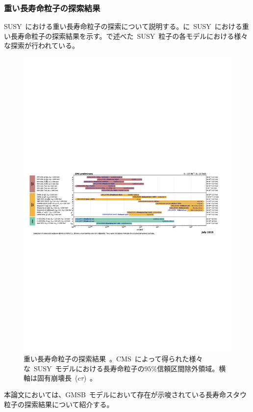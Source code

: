 \subsubsection{重い長寿命粒子の探索結果}
SUSY~における重い長寿命粒子の探索について説明する。に~SUSY~における重い長寿命粒子の探索結果を示す。で述べた~SUSY~粒子の各モデルにおける様々な探索が行われている。
\begin{figure}[H]
        \centering   
        \includegraphics[width=\textwidth,page=1]{img/pdf/susy2.pdf}
        \caption[重い長寿命粒子の探索結果]{重い長寿命粒子の探索結果~\cite{AR:13}。CMS~によって得られた様々な~SUSY~モデルにおける長寿命粒子の$95\%$信頼区間除外領域。横軸は固有崩壊長~($c\tau$)~。}\label{fig:susy2}
\end{figure}

本論文においては、GMSB~モデルにおいて存在が示唆されている長寿命スタウ粒子の探索結果について紹介する。

